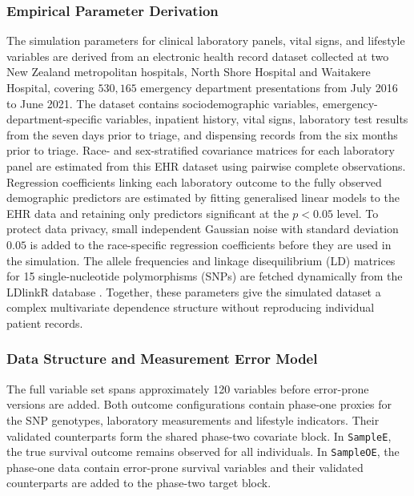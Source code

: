 \subsubsection{Empirical Parameter Derivation}

The simulation parameters for clinical laboratory panels, vital signs, and lifestyle variables are derived from an electronic health record dataset collected at two New Zealand metropolitan hospitals, North Shore Hospital and Waitakere Hospital, covering $530{,}165$ emergency department presentations from July 2016 to June 2021. The dataset contains sociodemographic variables, emergency-department-specific variables, inpatient history, vital signs, laboratory test results from the seven days prior to triage, and dispensing records from the six months prior to triage. Race- and sex-stratified covariance matrices for each laboratory panel are estimated from this EHR dataset using pairwise complete observations. Regression coefficients linking each laboratory outcome to the fully observed demographic predictors are estimated by fitting generalised linear models to the EHR data and retaining only predictors significant at the $p < 0.05$ level. To protect data privacy, small independent Gaussian noise with standard deviation $0.05$ is added to the race-specific regression coefficients before they are used in the simulation. The allele frequencies and linkage disequilibrium (LD) matrices for 15 single-nucleotide polymorphisms (SNPs) are fetched dynamically from the LDlinkR database \citep{Machiela2015}. Together, these parameters give the simulated dataset a complex multivariate dependence structure without reproducing individual patient records.

\subsubsection{Data Structure and Measurement Error Model}
The full variable set spans approximately 120 variables before error-prone versions are added. Both outcome configurations contain phase-one proxies for the SNP genotypes, laboratory measurements and lifestyle indicators. Their validated counterparts form the shared phase-two covariate block. In \texttt{SampleE}, the true survival outcome remains observed for all individuals. In \texttt{SampleOE}, the phase-one data contain error-prone survival variables and their validated counterparts are added to the phase-two target block.

